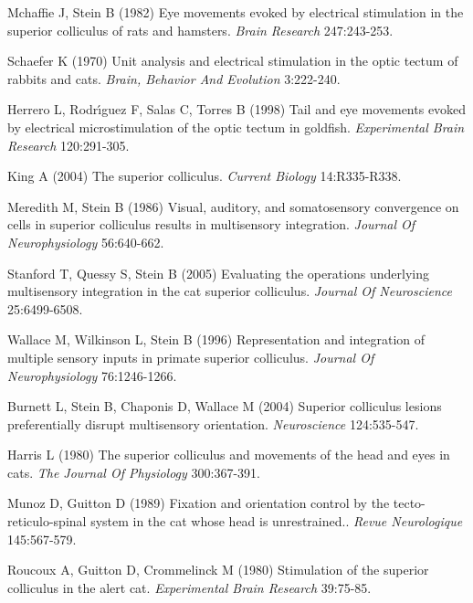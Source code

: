 \documentclass{ar-1col}
\begin{document}
{\begin{thebibliography}{00}
Mchaffie J, Stein B (1982) 
Eye movements evoked by electrical stimulation in the superior colliculus of rats and hamsters.
\textit{ Brain Research} 247:243-253.

Schaefer K (1970) 
Unit analysis and electrical stimulation in the optic tectum of rabbits and cats.
\textit{ Brain, Behavior And Evolution} 3:222-240.

Herrero L, Rodr{\'\i}guez F, Salas C, Torres B (1998) 
Tail and eye movements evoked by electrical microstimulation of the optic tectum in goldfish.
\textit{ Experimental Brain Research} 120:291-305.

King A (2004) 
The superior colliculus.
\textit{ Current Biology} 14:R335-R338.

Meredith M, Stein B (1986) 
Visual, auditory, and somatosensory convergence on cells in superior colliculus results in multisensory integration.
\textit{ Journal Of Neurophysiology} 56:640-662.

Stanford T, Quessy S, Stein B (2005) 
Evaluating the operations underlying multisensory integration in the cat superior colliculus.
\textit{ Journal Of Neuroscience} 25:6499-6508.

Wallace M, Wilkinson L, Stein B (1996) 
Representation and integration of multiple sensory inputs in primate superior colliculus.
\textit{ Journal Of Neurophysiology} 76:1246-1266.

Burnett L, Stein B, Chaponis D, Wallace M (2004) 
Superior colliculus lesions preferentially disrupt multisensory orientation.
\textit{ Neuroscience} 124:535-547.

Harris L (1980) 
The superior colliculus and movements of the head and eyes in cats.
\textit{ The Journal Of Physiology} 300:367-391.

Munoz D, Guitton D (1989) 
Fixation and orientation control by the tecto-reticulo-spinal system in the cat whose head is unrestrained..
\textit{ Revue Neurologique} 145:567-579.

Roucoux A, Guitton D, Crommelinck M (1980) 
Stimulation of the superior colliculus in the alert cat.
\textit{ Experimental Brain Research} 39:75-85.


\end{thebibliography}}
\end{document}
